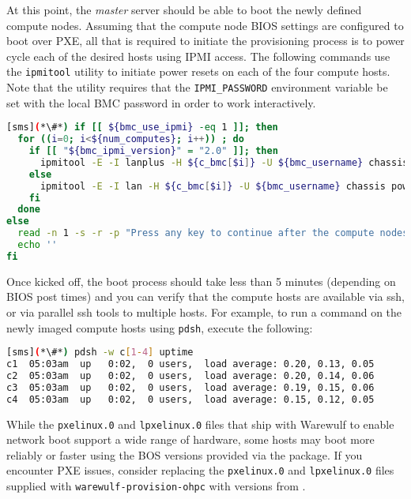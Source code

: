 At this point, the {\em master} server should be able to boot the newly defined
compute nodes. Assuming that the compute node BIOS settings are configured to
boot over PXE, all that is required to initiate the provisioning process is to
power cycle each of the desired hosts using IPMI access.
The following commands use the \texttt{ipmitool} utility to initiate power
resets on each of the four compute hosts. Note that the utility requires that
the \texttt{IPMI\_PASSWORD} environment variable be set with the local BMC password in
order to work interactively.

\begin{lstlisting}[language=bash,keywords={},upquote=true]
[sms](*\#*) if [[ ${bmc_use_ipmi} -eq 1 ]]; then
  for ((i=0; i<${num_computes}; i++)) ; do
    if [[ "${bmc_ipmi_version}" = "2.0" ]]; then
      ipmitool -E -I lanplus -H ${c_bmc[$i]} -U ${bmc_username} chassis power reset
    else
      ipmitool -E -I lan -H ${c_bmc[$i]} -U ${bmc_username} chassis power reset
    fi
  done
else
  read -n 1 -s -r -p "Press any key to continue after the compute nodes are up"
  echo ''
fi
\end{lstlisting} 

Once kicked off, the boot process should take less than 5 minutes (depending on
BIOS post times) and you can verify that the compute hosts are available via
ssh, or via parallel ssh tools to multiple hosts. For example, to run a command
on the newly imaged compute hosts using \texttt{pdsh}, execute the following:

  
\begin{lstlisting}[language=bash]
[sms](*\#*) pdsh -w c[1-4] uptime
c1  05:03am  up   0:02,  0 users,  load average: 0.20, 0.13, 0.05
c2  05:03am  up   0:02,  0 users,  load average: 0.20, 0.14, 0.06
c3  05:03am  up   0:02,  0 users,  load average: 0.19, 0.15, 0.06
c4  05:03am  up   0:02,  0 users,  load average: 0.15, 0.12, 0.05
\end{lstlisting}

\begin{center}
\begin{tcolorbox}[]
\small While the \texttt{pxelinux.0} and \texttt{lpxelinux.0} files that ship
with Warewulf to enable network boot support a wide range of hardware, some
hosts may boot more reliably or faster using the BOS versions provided via the
\texttt{\tftppkg{}} package. If you encounter PXE issues, consider
replacing the \texttt{pxelinux.0} and \texttt{lpxelinux.0} files supplied with
\texttt{warewulf-provision-ohpc} with versions from \texttt{\tftppkg{}}.
\end{tcolorbox}
\end{center}
\fi

